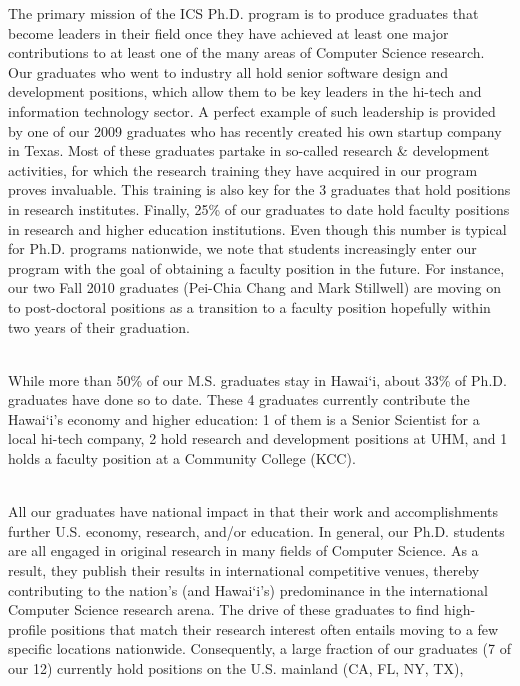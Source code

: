 \documentclass[12pt]{article}
\begin{document}
The primary mission of the ICS Ph.D. program is to produce graduates
that become leaders in their field once they have achieved at least
one major contributions to at least one of the many areas of Computer
Science research. Our graduates who went to industry all hold senior
software design and development positions, which allow them to be key
leaders in the hi-tech and information technology sector. A
perfect example of such leadership is provided by one of our 2009 graduates
who has recently created his own startup company in Texas. Most of
these graduates partake in so-called research \& development
activities, for which the research training they have acquired in our
program proves invaluable.  This training is also key for the 3
graduates that hold positions in research institutes.  Finally, 25\%
of our graduates to date hold faculty positions in research and higher
education institutions. Even though this number is typical for Ph.D.
programs nationwide, we note that students increasingly
enter our program with the goal of obtaining a faculty position in the
future. For instance, our two Fall 2010 graduates (Pei-Chia Chang and
Mark Stillwell) are moving on to post-doctoral positions as a
transition to a faculty position hopefully within two years of their graduation.

~\\
 While more than 50\% of
our M.S. graduates stay in Hawai`i, about 33\% of Ph.D. graduates have
done so to date.  These 4 graduates currently contribute the Hawai`i's
economy and higher education: 1 of them is a Senior Scientist for a
local hi-tech company, 2 hold research and development positions
at UHM, and 1 holds a faculty position at a Community College (KCC). 

~\\
 All our graduates have
national impact in that their work and accomplishments further U.S.
economy, research, and/or education.  In general, our Ph.D. students
are all engaged in original research in many fields of Computer
Science. As a result, they publish their results in international
competitive venues, thereby contributing to the nation's (and
Hawai`i's) predominance in the international Computer Science research
arena.  The drive of these graduates to find high-profile positions
that match their research interest often entails moving to a few
specific locations nationwide.  Consequently, a large fraction of our
graduates (7 of our 12) currently hold positions on the U.S. mainland
(CA, FL, NY, TX),
\end{document}
